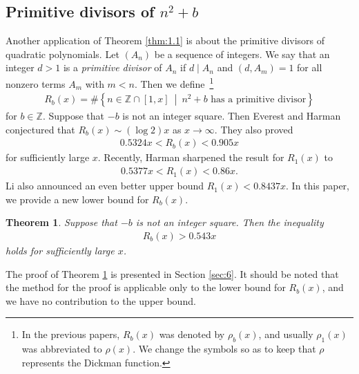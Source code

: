 \documentclass[a4paper,11pt]{amsart}
\newtheorem{theorem}{Theorem}[section]
\theoremstyle{definition}
\numberwithin{equation}{section}
\begin{document}
\subsection{Primitive divisors of $n^2+b$}\label{sec:1.3}
Another application of Theorem \ref{thm:1.1} is about the primitive divisors of quadratic polynomials. 
Let $(A_n)$ be a sequence of integers. 
We say that an integer $d>1$ is a \textit{primitive divisor} of $A_n$ if $d \mid A_n$ and $(d,A_m)=1$ for all nonzero terms $A_m$ with $m<n$. 
Then we define\
\footnote{
In the previous papers, $R_b(x)$ was denoted by $\rho_b(x)$, and usually $\rho_1(x)$ was abbreviated to $\rho(x)$. 
We change the symbols so as to keep that $\rho$ represents the Dickman function. 
}
\begin{align*}
R_b(x)
= \# \left\{n \in \mathbb{Z} \cap [1,x] ~\middle|~ \textrm{$n^2+b$ has a primitive divisor} \right\}
\end{align*}
for $b \in \mathbb{Z}$. 
Suppose that $-b$ is not an integer square. 
Then Everest and Harman \cite{EverestHarman2008} conjectured that $R_b(x) \sim (\log{2})x$ as $x \to\infty$. 
They also proved 
\begin{align*}
0.5324x
< R_b(x)
< 0.905x
\end{align*}
for sufficiently large $x$. 
Recently, Harman \cite{Harman2024} sharpened the result for $R_1(x)$ to
\begin{align*}
0.5377x
< R_1(x)
< 0.86x. 
\end{align*}
Li \cite{Li2024+} also announced an even better upper bound $R_1(x)<0.8437x$. 
In this paper, we provide a new lower bound for $R_b(x)$. 

\begin{theorem}\label{thm:1.3}
Suppose that $-b$ is not an integer square. 
Then the inequality
\begin{align*}
R_b(x)
> 0.543x
\end{align*}
holds for sufficiently large $x$. 
\end{theorem}

The proof of Theorem \ref{thm:1.3} is presented in Section \ref{sec:6}. 
It should be noted that the method for the proof is applicable only to the lower bound for $R_b(x)$, and we have no contribution to the upper bound. 
\end{document}
